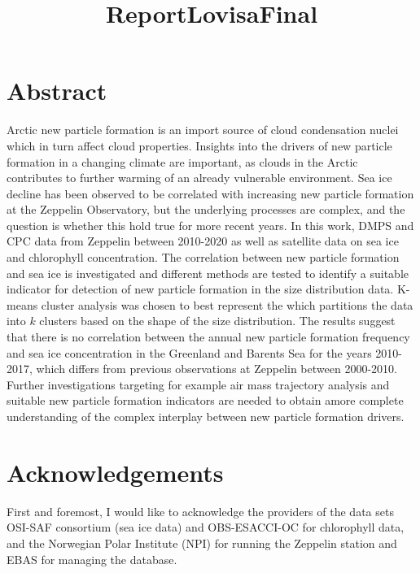 \documentclass[11pt]{article}
\title{ReportLovisaFinal}
\begin{document}
    
    \maketitle
    
    

    
    \hypertarget{abstract}{%
\section{Abstract}\label{abstract}}

Arctic new particle formation is an import source of cloud condensation
nuclei which in turn affect cloud properties. Insights into the drivers
of new particle formation in a changing climate are important, as clouds
in the Arctic contributes to further warming of an already vulnerable
environment. Sea ice decline has been observed to be correlated with
increasing new particle formation at the Zeppelin Observatory, but the
underlying processes are complex, and the question is whether this hold
true for more recent years. In this work, DMPS and CPC data from
Zeppelin between 2010-2020 as well as satellite data on sea ice and
chlorophyll concentration. The correlation between new particle
formation and sea ice is investigated and different methods are tested
to identify a suitable indicator for detection of new particle formation
in the size distribution data. K-means cluster analysis was chosen to
best represent the which partitions the data into \(k\) clusters based
on the shape of the size distribution. The results suggest that there is
no correlation between the annual new particle formation frequency and
sea ice concentration in the Greenland and Barents Sea for the years
2010-2017, which differs from previous observations at Zeppelin between
2000-2010. Further investigations targeting for example air mass
trajectory analysis and suitable new particle formation indicators are
needed to obtain amore complete understanding of the complex interplay
between new particle formation drivers.

    \hypertarget{acknowledgements}{%
\section{Acknowledgements}\label{acknowledgements}}

First and foremost, I would like to acknowledge the providers of the
data sets OSI-SAF consortium (sea ice data) and OBS-ESACCI-OC for
chlorophyll data, and the Norwegian Polar Institute (NPI) for running
the Zeppelin station and EBAS for managing the database.
\end{document}
